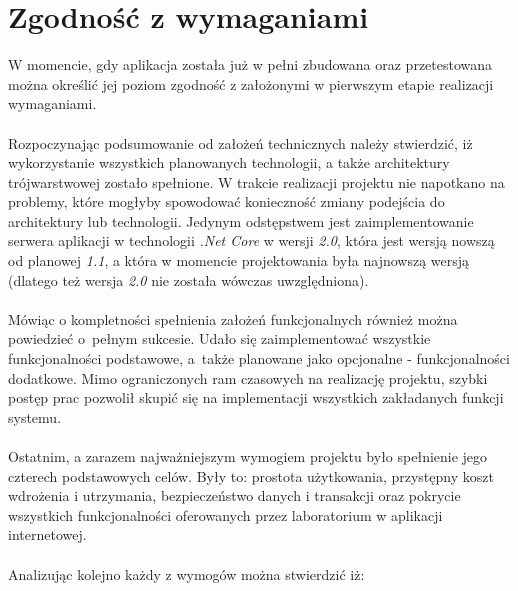 \section{Zgodność z wymaganiami}
\quad W momencie, gdy aplikacja została już w pełni zbudowana oraz przetestowana można określić jej poziom zgodność z założonymi w pierwszym etapie realizacji wymaganiami.\\
\\
Rozpoczynając podsumowanie od założeń technicznych należy stwierdzić, iż wykorzystanie wszystkich planowanych technologii, a także architektury trójwarstwowej zostało spełnione. W trakcie realizacji projektu nie napotkano na problemy, które mogłyby spowodować konieczność zmiany podejścia do architektury lub technologii. Jedynym odstępstwem jest zaimplementowanie serwera aplikacji w technologii \textit{.Net Core} w wersji \textit{2.0}, która jest wersją nowszą od planowej \textit{1.1}, a która w momencie projektowania była najnowszą wersją (dlatego też wersja \textit{2.0} nie została wówczas uwzględniona).\\
\\
Mówiąc o kompletności spełnienia założeń funkcjonalnych również można powiedzieć o~pełnym sukcesie. Udało się zaimplementować wszystkie funkcjonalności podstawowe, a~także planowane jako opcjonalne - funkcjonalności dodatkowe. Mimo ograniczonych ram czasowych na realizację projektu, szybki postęp prac pozwolił skupić się na implementacji wszystkich zakładanych funkcji systemu.\\
\\
Ostatnim, a zarazem najważniejszym wymogiem projektu było spełnienie jego czterech podstawowych celów. Były to: prostota użytkowania, przystępny koszt wdrożenia i utrzymania, bezpieczeństwo danych i transakcji oraz pokrycie wszystkich funkcjonalności oferowanych przez laboratorium w aplikacji internetowej. \\
\\
Analizując kolejno każdy z wymogów można stwierdzić iż:
